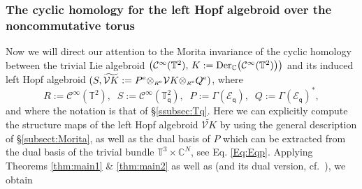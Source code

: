 \documentclass[reqno, a4paper, 10pt]{amsart}
\numberwithin{equation}{section}
\theoremstyle{plain}
\theoremstyle{definition}
\theoremstyle{remark}
\begin{document}
\subsubsection{The cyclic homology  for the left Hopf algebroid over  the noncommutative torus}\label{ssubsec:q} 
Now we will direct our attention to the Morita invariance of the cyclic homology 
between the trivial Lie algebroid $\big( {{\mathcal C}}^{\infty}(\mathbb{T}^2),\, K:={\rm Der}_{\mathbb{C}}\big( {{\mathcal C}}^{\infty}(\mathbb{T}^2)\big)\big)$ and its induced 
left Hopf algebroid $(S, \widetilde{{{\mathcal V}} K}:={{P^{\rm e}}}{\otimes_{\scriptscriptstyle{{R^{\rm e}}}}}{{\mathcal V}} K {\otimes_{\scriptscriptstyle{{R^{\rm e}}}}} {{Q^{\rm e}}})$, where 
\begin{equation}\label{Eq: Morita torus}
R:={{\mathcal C}}^{\infty}(\mathbb{T}^2), \;\;  S:= {{\mathcal C}}^{\infty}(\mathbb{T}_{{\mathsf{{q}}}}^2),\;\;  P:=\Gamma({{\mathcal E}}_{{\mathsf{{q}}}}),\;\; Q:=  \Gamma({{\mathcal E}}_{{\mathsf{{q}}}})^{*},
\end{equation}
and where the notation is that of \S\ref{ssubsec:Tq}. Here we can explicitly compute the structure maps of the left Hopf algebroid $\widetilde{{{\mathcal V}} K}$ by using  the general description of \S\ref{subsect:Morita}, as well as the dual basis of $P$ which can be extracted from the dual basis of the trivial bundle $\mathbb{T}^3 \times \mathbb{C}^N$, see Eq. \eqref{Eq:Eqp}.  Applying  Theorems \ref{thm:main1} \& \ref{thm:main2} as well as \cite[Theorem 5.2]{KowKra:CSIACT} (and its dual version, cf.~\cite[Theorem~3.14]{KowPos:TCTOHA}), we obtain
\end{document}
